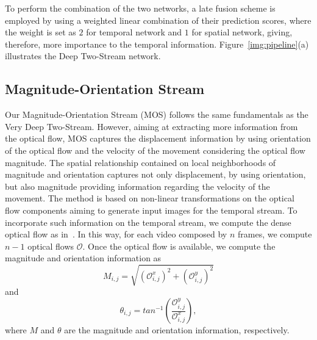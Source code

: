 \documentclass[10pt,conference]{IEEEtran}
\begin{document}
To perform the combination of the two networks, a late fusion scheme is employed by using a weighted linear combination of their prediction scores, where the weight is set as $2$ for temporal network and $1$ for spatial network, giving, therefore, more importance to the temporal information. Figure~\ref{img:pipeline}(a) illustrates the Deep Two-Stream network.


\subsection{Magnitude-Orientation Stream}

Our Magnitude-Orientation Stream (MOS) follows the same fundamentals as the Very Deep Two-Stream. However, aiming at extracting more information from the optical flow, MOS captures the displacement information by using orientation of the optical flow and the velocity of the movement considering the optical flow magnitude. The spatial relationship contained on local neighborhoods of magnitude and orientation captures not only displacement, by using orientation, but also magnitude providing information regarding the velocity of the movement. The method is based on non-linear transformations on the optical flow components aiming to generate input images for the temporal stream. 
%
%
To incorporate such information on the temporal stream, we compute the dense optical flow as in~\cite{Wang:2015}. In this way, for each video composed by $n$ frames, we compute $n-1$ optical flows $\mathcal O$. Once the optical flow is available, we compute the magnitude and orientation information as
\begin{equation}\label{eq:mag}
	M_{i,j} = \sqrt{ (\mathcal O^{x}_{i,j})^{2} + (\mathcal O^{y}_{i,j})^{2}}
\end{equation}
and
\begin{equation}\label{eq:ori}
	\theta_{i,j} = tan^{-1} \left( \frac{\mathcal O^{y}_{i,j}}{\mathcal O^{x}_{i,j}} \right),
\end{equation}
\noindent where $M$ and $\theta$ are the magnitude and orientation information, respectively.
\end{document}

